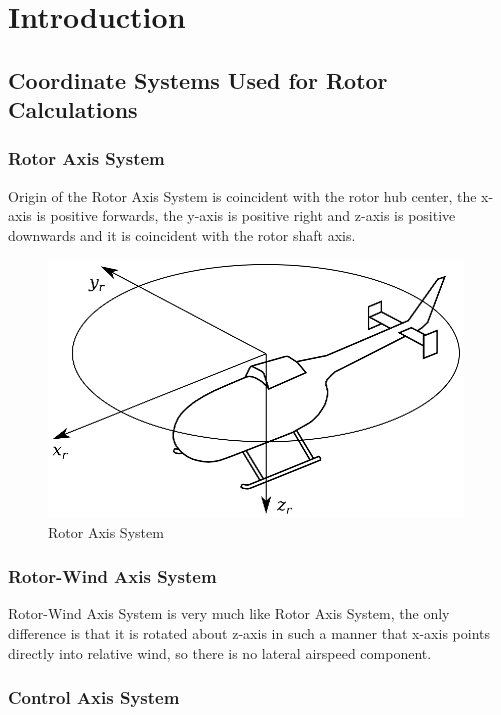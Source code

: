 \chapter{Introduction}

\section{Coordinate Systems Used for Rotor Calculations}

\subsection{Rotor Axis System}

Origin of the Rotor Axis System is coincident with the rotor hub center, the x-axis is positive forwards, the y-axis is positive right and z-axis is positive downwards and it is coincident with the rotor shaft axis.

\begin{figure}[h!]
  \centering
  \includegraphics[width=110mm]{images/coordinate_system_RAS.eps}
  \caption{Rotor Axis System}
\end{figure}

\subsection{Rotor-Wind Axis System}

Rotor-Wind Axis System is very much like Rotor Axis System, the only difference is that it is rotated about z-axis in such a manner that x-axis points directly into relative wind, so there is no lateral airspeed component.

\subsection{Control Axis System}

